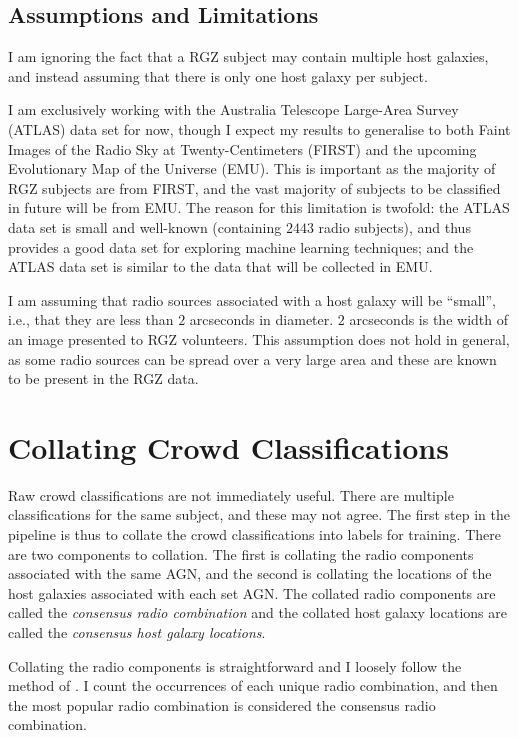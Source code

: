 \documentclass[a4paper]{article}
\begin{document}
        \subsection{Assumptions and Limitations}

            I am ignoring the fact that a RGZ subject may contain multiple host galaxies, and instead assuming that there is only one host galaxy per subject.

            I am exclusively working with the Australia Telescope Large-Area Survey (ATLAS)\citep{norris06} data set for now, though I expect my results to generalise to both Faint Images of the Radio Sky at Twenty-Centimeters (FIRST)\citep{becker95} and the upcoming Evolutionary Map of the Universe (EMU)\citep{norris11}. This is important as the majority of RGZ subjects are from FIRST, and the vast majority of subjects to be classified in future will be from EMU. The reason for this limitation is twofold: the ATLAS data set is small and well-known (containing $2443$ radio subjects), and thus provides a good data set for exploring machine learning techniques; and the ATLAS data set is similar to the data that will be collected in EMU\cite{banfield15}.

            I am assuming that radio sources associated with a host galaxy will be ``small'', i.e., that they are less than $2$ arcseconds in diameter. $2$ arcseconds is the width of an image presented to RGZ volunteers. This assumption does not hold in general, as some radio sources can be spread over a very large area and these are known to be present in the RGZ data\citep{banfield16}.

    \section{Collating Crowd Classifications}

        Raw crowd classifications are not immediately useful. There are multiple classifications for the same subject, and these may not agree. The first step in the pipeline is thus to collate the crowd classifications into labels for training. There are two components to collation. The first is collating the radio components associated with the same AGN, and the second is collating the locations of the host galaxies associated with each set AGN. The collated radio components are called the \emph{consensus radio combination} and the collated host galaxy locations are called the \emph{consensus host galaxy locations}.

        Collating the radio components is straightforward and I loosely follow the method of \citet{banfield15}. I count the occurrences of each unique radio combination, and then the most popular radio combination is considered the consensus radio combination.
\end{document}
